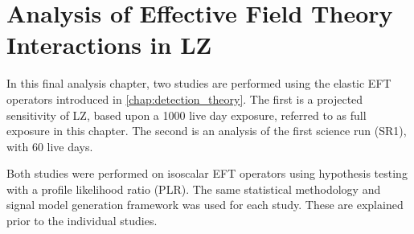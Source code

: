 \chapter{Analysis of Effective Field Theory Interactions in LZ}
\label{chap:analysis_eft_work}
In this final analysis chapter, two studies are performed using the elastic EFT operators introduced in \autoref{chap:detection_theory}.
The first is a projected sensitivity of LZ, based upon a 1000 live day exposure, referred to as full exposure in this chapter.
The second is an analysis of the first science run (SR1), with 60 live days.
\par
Both studies were performed on isoscalar EFT operators using hypothesis testing with a profile likelihood ratio (PLR).
The same statistical methodology and signal model generation framework was used for each study.
These are explained prior to the individual studies.



%






\clearpage


%

%

